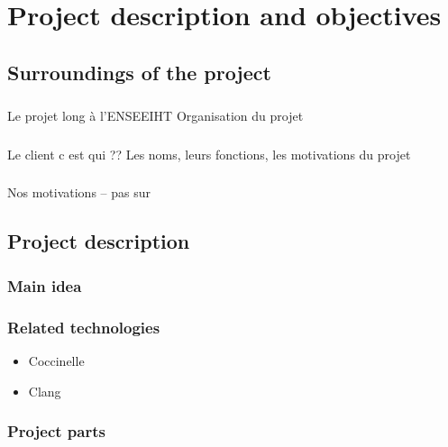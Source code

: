 \documentclass{report}
\begin{document}
\chapter{Project description and objectives}

\section{Surroundings of the project}

\paragraph{}
\hspace{4mm}\textnormal{Le projet long \`{a} l'ENSEEIHT
	Organisation du projet}

\paragraph{}
\hspace{4mm}\textnormal{Le client c est qui ?? Les noms, leurs fonctions, les motivations du projet}

\paragraph{}
\hspace{4mm}\textnormal{Nos motivations -- pas sur}

\section{Project description}

\subsection{Main idea}

\subsection{Related technologies}

\vspace{4mm}
\begin{itemize}
\item Coccinelle\vspace{1mm}
\item Clang\vspace{1mm}
\end{itemize}

\subsection{Project parts}
\end{document}
